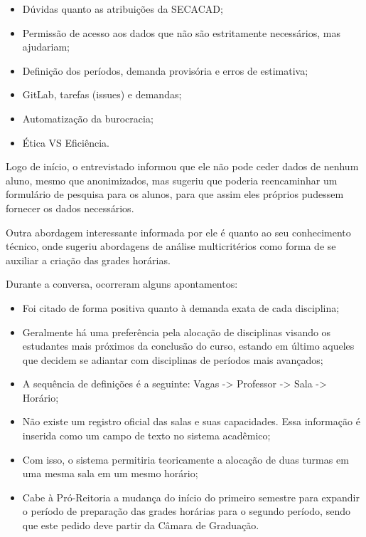         \begin{itemize}
            \item Dúvidas quanto as atribuições da SECACAD;
            \item Permissão de acesso aos dados que não são estritamente necessários, mas ajudariam;
            \item Definição dos períodos, demanda provisória e erros de estimativa;
            \item GitLab, tarefas (issues) e demandas;
            \item Automatização da burocracia;
            \item Ética VS Eficiência.
        \end{itemize}


        Logo de início, o entrevistado informou que ele não pode ceder dados de nenhum aluno, mesmo que anonimizados, mas sugeriu que poderia reencaminhar um formulário de pesquisa para os alunos, para que assim eles próprios pudessem fornecer os dados necessários.

        Outra abordagem interessante informada por ele é quanto ao seu conhecimento técnico, onde sugeriu abordagens de análise multicritérios como forma de se auxiliar a criação das grades horárias.

        Durante a conversa, ocorreram alguns apontamentos:

        \begin{itemize}
            \item Foi citado de forma positiva quanto à demanda exata de cada disciplina;
            \item Geralmente há uma preferência pela alocação de disciplinas visando os estudantes mais próximos da conclusão do curso, estando em último aqueles que decidem se adiantar com disciplinas de períodos mais avançados;
            \item A sequência de definições é a seguinte: Vagas -> Professor -> Sala -> Horário;
            \item Não existe um registro oficial das salas e suas capacidades. Essa informação é inserida como um campo de texto no sistema acadêmico;
            \item Com isso, o sistema permitiria teoricamente a alocação de duas turmas em uma mesma sala em um mesmo horário;
            \item Cabe à Pró-Reitoria a mudança do início do primeiro semestre para expandir o período de preparação das grades horárias para o segundo período, sendo que este pedido deve partir da Câmara de Graduação.
        \end{itemize}


